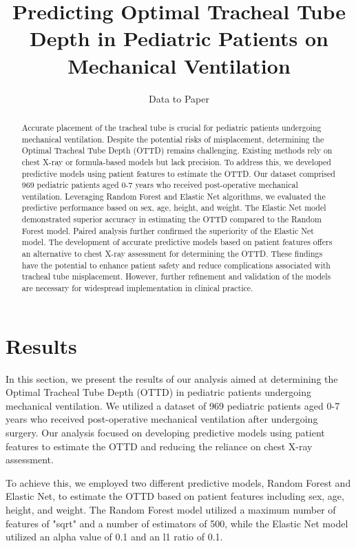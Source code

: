 \documentclass[11pt]{article}
\title{Predicting Optimal Tracheal Tube Depth in Pediatric Patients on Mechanical Ventilation}
\author{Data to Paper}
\begin{document}
\maketitle
\begin{abstract}
Accurate placement of the tracheal tube is crucial for pediatric patients undergoing mechanical ventilation. Despite the potential risks of misplacement, determining the Optimal Tracheal Tube Depth (OTTD) remains challenging. Existing methods rely on chest X-ray or formula-based models but lack precision. To address this, we developed predictive models using patient features to estimate the OTTD. Our dataset comprised 969 pediatric patients aged 0-7 years who received post-operative mechanical ventilation. Leveraging Random Forest and Elastic Net algorithms, we evaluated the predictive performance based on sex, age, height, and weight. The Elastic Net model demonstrated superior accuracy in estimating the OTTD compared to the Random Forest model. Paired analysis further confirmed the superiority of the Elastic Net model. The development of accurate predictive models based on patient features offers an alternative to chest X-ray assessment for determining the OTTD. These findings have the potential to enhance patient safety and reduce complications associated with tracheal tube misplacement. However, further refinement and validation of the models are necessary for widespread implementation in clinical practice.
\end{abstract}
\section*{Results}

In this section, we present the results of our analysis aimed at determining the Optimal Tracheal Tube Depth (OTTD) in pediatric patients undergoing mechanical ventilation. We utilized a dataset of 969 pediatric patients aged 0-7 years who received post-operative mechanical ventilation after undergoing surgery. Our analysis focused on developing predictive models using patient features to estimate the OTTD and reducing the reliance on chest X-ray assessment.

To achieve this, we employed two different predictive models, Random Forest and Elastic Net, to estimate the OTTD based on patient features including sex, age, height, and weight. The Random Forest model utilized a maximum number of features of "sqrt" and a number of estimators of 500, while the Elastic Net model utilized an alpha value of 0.1 and an l1 ratio of 0.1.
\end{document}
